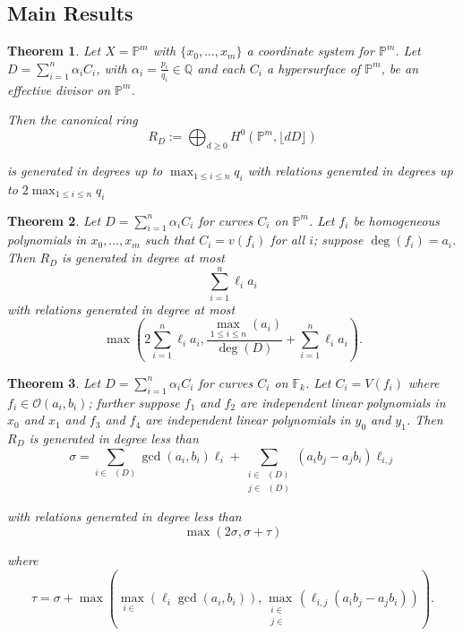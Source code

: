 \documentclass{amsart}
\theoremstyle{plain}
\newtheorem{thm}{Theorem}[section]
\theoremstyle{definition}
\theoremstyle{remark}
\numberwithin{equation}{section}
\newcommand\ssec{\subsection}
\newcommand\bq{{\mathbb Q}}
\newcommand\bp{{\mathbb P}}
\newcommand\sco{{\mathscr O}}
\newcommand\bida{a}
\newcommand\bidb{b}
\newcommand\hirz{\mathbb{F}}
\DeclareMathOperator{\Te}{T_=}
\DeclareMathOperator{\Tp}{T_+}
\DeclareMathOperator{\Tm}{T_-}
\begin{document}

\ssec{Main Results}


\begin{thm}
\label{thm:proj-effective-intro}
Let $X = \bp^m$ with $\{x_0, \ldots, x_m\}$ a coordinate system for
$\bp^m$. Let $D = \sum_{i = 1}^{n} \alpha_i C_i$, with $\alpha_i =
\frac{p_i}{q_i} \in \bq$ and each $C_i$ a hypersurface of
$\bp^m$, be an effective divisor on $\bp^m$.

Then the canonical ring
\[
	R_D := \bigoplus_{d \geq 0} H^0(\bp^m, \lfloor dD \rfloor)
\]

\noindent
is generated in degrees up to $\max_{1 \leq i \leq n}{q_i}$ with
relations generated in degrees up to $2 \max_{1 \leq i \leq n}{q_i}$
\end{thm}


\begin{thm}
\label{proj-generators-relations-intro}
Let $D = \sum_{i=1}^n \alpha_i C_i$ for curves $C_i$ on $\mathbb{P}^m$.  Let $f_i$ be homogeneous polynomials in $x_0, \ldots, x_m$ such that $C_i = v(f_i)$ for all $i$; suppose $\deg(f_i) = a_i$. 
Then $R_D$ is generated in degree at most 
\[
	\sum_{i=1}^n \ell_i a_i
\]
with relations generated in degree at most
\[
	\max \left(2 \sum_{i=1}^n \ell_i a_i, \frac{\max_{1\le i \le n}(\bida_i)}{\deg(D)} + \sum_{i=1}^n \ell_i a_i \right).
\]
\end{thm}


\begin{thm}
\label{lem:hirz-generators-relations}
Let $D = \sum_{i=1}^n \alpha_i C_i$ for curves $C_i$ on $\hirz_k$.  
Let $C_i = V(f_i)$ where $f_i \in \sco(a_i, b_i)$; further 
suppose $f_1$ and $f_2$ are independent linear
polynomials in $x_0$ and $x_1$ and $f_3$ and $f_4$ are independent
linear polynomials in $y_0$ and $y_1$.
Then $R_D$ is generated in degree less than 
\[
	\sigma = \sum_{i\in \Te(D)} \gcd(\bida_i, \bidb_i)\ell_i +
	\sum_{\substack{i	\in \Tp(D) \\	j \in \Tm(D)}} (\bida_i
	\bidb_j - \bida_j \bidb_i)\ell_{i,j}
\]

\noindent
with relations generated in degree less than 
\[
	\max(2 \sigma, \sigma + \tau)
\]

\noindent
where
\[
	\tau = \sigma
	+ \max \left( \max_{i\in \Te}(\ell_i \gcd(a_i, b_i)), \max_{
	\substack{i \in	\Tp \\ j\in \Tm}}(\ell_{i,j} (\bida_i \bidb_j
	- \bida_j \bidb_i))	\right).
\]
\end{thm}
\end{document}
